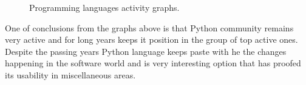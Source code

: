 \begin{figure}[ht]
  \begin{center}
  \end{center}
  \caption{Programming languages activity graphs.}
  \label{ohloh_lang_graph}
\end{figure}
One of conclusions from the graphs above is that Python community remains very active and for long years  keeps it position in the group of top active ones. Despite the passing years Python language keeps paste with he the changes happening in the software world and is very interesting option that has proofed its usability in miscellaneous areas.  

